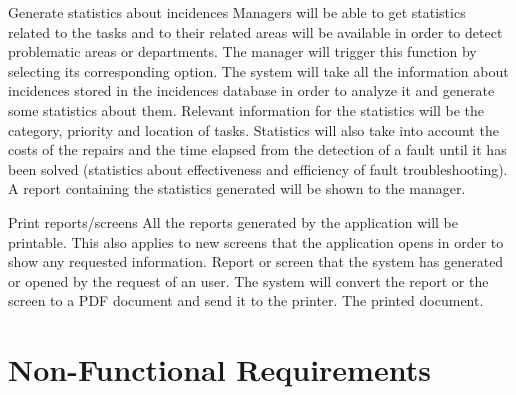 \begin{requirement}{Generate statistics about incidences}
\reqdesc Managers will be able to get statistics related to the tasks and to their related areas will be available in order to
detect problematic areas or departments.
\reqin The manager will trigger this function by selecting its corresponding option.
\reqsteps The system will take all the information about incidences stored in the incidences database in order to analyze it and generate some statistics about them. Relevant information for the statistics will be the category, priority and location of tasks. Statistics will also take into account the costs of the repairs and the time elapsed from the detection of a fault until it has been solved (statistics about effectiveness and efficiency of fault troubleshooting).
\reqout A report containing the statistics generated will be shown to the manager.
\end{requirement}

\begin{requirement}{Print reports/screens}
\reqdesc All the reports generated by the application will be printable. This also applies to new screens that the application opens in order to show any requested information.
\reqin Report or screen that the system has generated or opened by the request of an user.
\reqsteps The system will convert the report or the screen to a PDF document and send it to the printer.
\reqout The printed document.
\end{requirement}


\section{Non-Functional Requirements}

